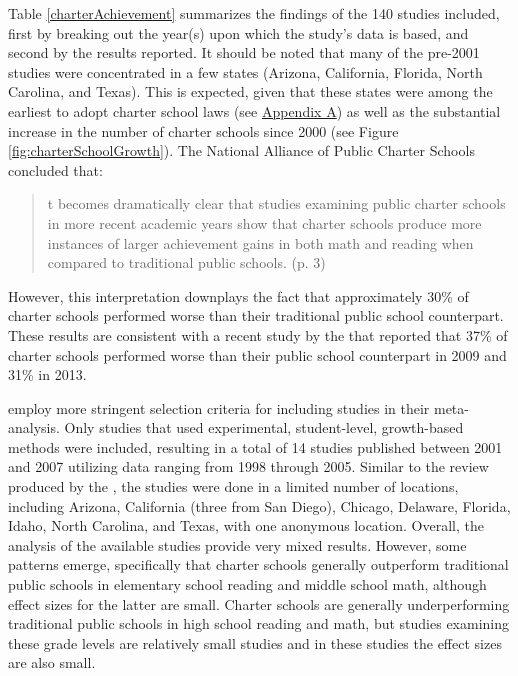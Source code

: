\documentclass[letterpaper,12p,twoside]{article} %
\renewcommand{\normalsize}{\fontsize{12}{13}\selectfont}
\begin{document}
Table \ref{charterAchievement} summarizes the findings of the 140 studies included, first by breaking out the year(s) upon which the study's data is based, and second by the results reported. It should be noted that many of the pre-2001 studies were concentrated in a few states (Arizona, California, Florida, North Carolina, and Texas). This is expected, given that these states were among the earliest to adopt charter school laws (see \hyperref[appendixA]{Appendix A}) as well as the substantial increase in the number of charter schools since 2000 (see Figure \ref{fig:charterSchoolGrowth}). The National Alliance of Public Charter Schools concluded that:

\begin{quote} \normalsize
[I]t becomes dramatically clear that studies examining public charter schools in more recent academic years show that charter schools produce more instances of larger achievement gains in both math and reading when compared to traditional public schools. (p. 3)
\end{quote}

\noindent However, this interpretation downplays the fact that approximately 30\% of charter schools performed worse than their traditional public school counterpart. These results are consistent with a recent study by the  that reported that 37\% of charter schools performed worse than their public school counterpart in 2009 and 31\% in 2013.



 employ more stringent selection criteria for including studies in their meta-analysis. Only studies that used experimental, student-level, growth-based methods were included, resulting in a total of 14 studies published between 2001 and 2007 utilizing data ranging from 1998 through 2005. Similar to the review produced by the , the studies were done in a limited number of locations, including Arizona, California (three from San Diego), Chicago, Delaware, Florida, Idaho, North Carolina, and Texas, with one anonymous location. Overall, the analysis of the available studies provide very mixed results. However, some patterns emerge, specifically that charter schools generally outperform traditional public schools in elementary school reading and middle school math, although effect sizes for the latter are small. Charter schools are generally underperforming traditional public schools in high school reading and math, but studies examining these grade levels are relatively small studies \cite<see also,>{whatweknow} and in these studies the effect sizes are also small.
\end{document}
